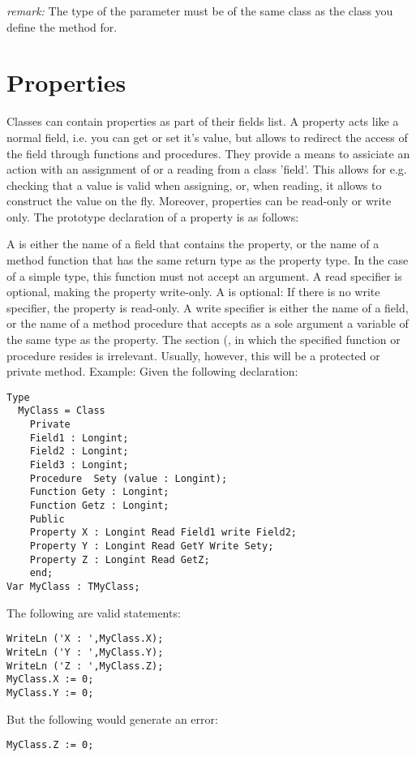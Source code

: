 \documentclass{report}
\begin{document}
{\em remark:} The type of the  parameter must be of the same class
as the class you define the method for.

\section{Properties}
Classes can contain properties as part of their fields list. A property
acts like a normal field, i.e. you can get or set it's value, but
allows to redirect the access of the field through functions and
procedures. They provide a means to assiciate an action with an assignment
of or a reading from a class 'field'. This allows for e.g. checking that a
value is valid when assigning, or, when reading, it allows to construct the
value on the fly. Moreover, properties can be read-only or write only.
The prototype declaration of a property is as follows:

A  is either the name of a field that contains the
property, or the name of a method function that has the same return type as
the property type. In the case of a simple type, this
function must not accept an argument. A read specifier is optional, making
the property write-only.
A  is optional: If there is no write specifier, the
property is read-only. A write specifier is either the name of a field, or
the name of a method procedure that accepts as a sole argument a variable of
the same type as the property.
The section (,  in which the specified function or
procedure resides is irrelevant. Usually, however, this will be a protected
or private method.
Example:
Given the following declaration:
\begin{verbatim}
Type
  MyClass = Class
    Private
    Field1 : Longint;
    Field2 : Longint;
    Field3 : Longint;
    Procedure  Sety (value : Longint);
    Function Gety : Longint;
    Function Getz : Longint;
    Public
    Property X : Longint Read Field1 write Field2;
    Property Y : Longint Read GetY Write Sety;
    Property Z : Longint Read GetZ;
    end;
Var MyClass : TMyClass;
\end{verbatim}
The following are valid statements:
\begin{verbatim}
WriteLn ('X : ',MyClass.X);
WriteLn ('Y : ',MyClass.Y);
WriteLn ('Z : ',MyClass.Z);
MyClass.X := 0;
MyClass.Y := 0;
\end{verbatim}
But the following would generate an error:
\begin{verbatim}
MyClass.Z := 0;
\end{verbatim}
\end{document}
